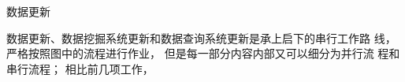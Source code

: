 \begin{nbeae}
\item 数据更新\\
\item 数据更新、数据挖掘系统更新和数据查询系统更新是承上启下的串行工作路
线，严格按照图中的流程进行作业， 但是每一部分内容内部又可以细分为并行流
程和串行流程； 相比前几项工作， 
\end{nbeae}

